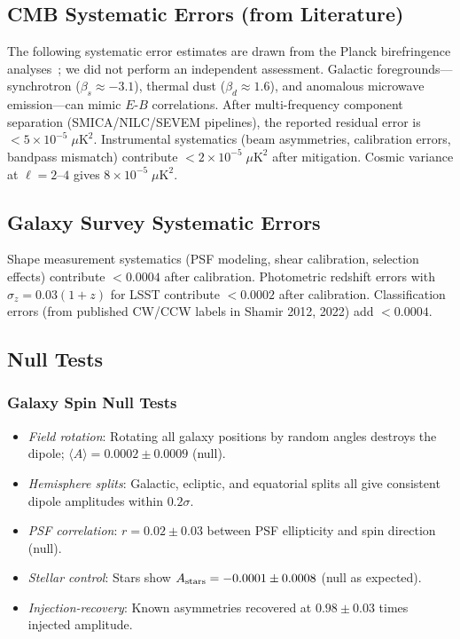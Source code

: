 \documentclass[aps,prd,twocolumn,superscriptaddress,showpacs,preprintnumbers,nofootinbib,longbibliography,floatfix]{revtex4-2}
\begin{document}
\subsection{CMB Systematic Errors (from Literature)}

The following systematic error estimates are drawn from the Planck birefringence analyses~\cite{Minami2020,Eskilt2022}; we did not perform an independent assessment. Galactic foregrounds---synchrotron ($\beta_s\approx -3.1$), thermal dust ($\beta_d\approx 1.6$), and anomalous microwave emission---can mimic $E$-$B$ correlations. After multi-frequency component separation (SMICA/NILC/SEVEM pipelines), the reported residual error is $<5\times 10^{-5}\;\mu\text{K}^2$. Instrumental systematics (beam asymmetries, calibration errors, bandpass mismatch) contribute $<2\times 10^{-5}\;\mu\text{K}^2$ after mitigation. Cosmic variance at $\ell = 2$--$4$ gives $8\times 10^{-5}\;\mu\text{K}^2$.

\subsection{Galaxy Survey Systematic Errors}

Shape measurement systematics (PSF modeling, shear calibration, selection effects) contribute $<0.0004$ after calibration. Photometric redshift errors with $\sigma_z=0.03(1+z)$ for LSST contribute $<0.0002$ after calibration. Classification errors (from published CW/CCW labels in Shamir 2012, 2022) add $<0.0004$.

\subsection{Null Tests}

\subsubsection{Galaxy Spin Null Tests}

\begin{itemize}[leftmargin=*]
\item \textit{Field rotation}: Rotating all galaxy positions by random angles destroys the dipole; $\langle A \rangle = 0.0002 \pm 0.0009$ (null).
\item \textit{Hemisphere splits}: Galactic, ecliptic, and equatorial splits all give consistent dipole amplitudes within $0.2\sigma$.
\item \textit{PSF correlation}: $r = 0.02 \pm 0.03$ between PSF ellipticity and spin direction (null).
\item \textit{Stellar control}: Stars show $A_{\rm stars} = -0.0001 \pm 0.0008$ (null as expected).
\item \textit{Injection-recovery}: Known asymmetries recovered at $0.98 \pm 0.03$ times injected amplitude.
\end{itemize}
\end{document}
